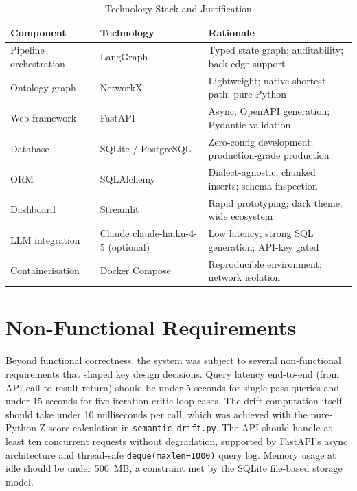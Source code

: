 \documentclass[12pt,a4paper]{report}
\begin{document}
\begin{table}[H]
  \centering
  \caption{Technology Stack and Justification}
  \label{tab:technology}
  \renewcommand{\arraystretch}{1.2}
  \begin{tabularx}{\textwidth}{@{}llX@{}}
    \toprule
    \textbf{Component} & \textbf{Technology} & \textbf{Rationale} \\
    \midrule
    Pipeline orchestration & LangGraph \cite{langgraph}    & Typed state graph; auditability; back-edge support \\
    Ontology graph         & NetworkX \cite{networkx}      & Lightweight; native shortest-path; pure Python \\
    Web framework          & FastAPI \cite{fastapi}        & Async; OpenAPI generation; Pydantic validation \\
    Database               & SQLite / PostgreSQL           & Zero-config development; production-grade production \\
    ORM                    & SQLAlchemy                    & Dialect-agnostic; chunked inserts; schema inspection \\
    Dashboard              & Streamlit                     & Rapid prototyping; dark theme; wide ecosystem \\
    LLM integration        & Claude claude-haiku-4-5 (optional) & Low latency; strong SQL generation; API-key gated \\
    Containerisation       & Docker Compose                & Reproducible environment; network isolation \\
    \bottomrule
  \end{tabularx}
\end{table}

\section{Non-Functional Requirements}
\label{sec:nfr}

Beyond functional correctness, the system was subject to several non-functional requirements that shaped key design decisions. Query latency end-to-end (from \ac{API} call to result return) should be under 5 seconds for single-pass queries and under 15 seconds for five-iteration critic-loop cases. The drift computation itself should take under 10 milliseconds per call, which was achieved with the pure-Python Z-score calculation in \texttt{semantic\_drift.py}. The \ac{API} should handle at least ten concurrent requests without degradation, supported by FastAPI's async architecture and thread-safe \texttt{deque(maxlen=1000)} query log. Memory usage at idle should be under 500~MB, a constraint met by the SQLite file-based storage model.
\end{document}
